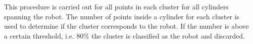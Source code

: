 This procedure is carried out for all points in each cluster for all cylinders spanning the robot. The number of points inside a cylinder for each cluster is used to determine if the cluster corresponds to the robot. If the number is above a certain threshold, i.e. 80\% the cluster is classified as the robot and discarded.
